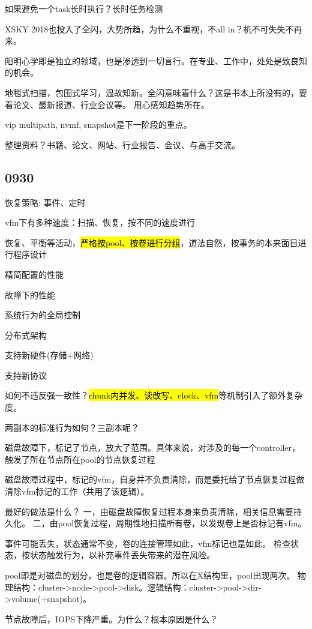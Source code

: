 如果避免一个task长时执行？长时任务检测

XSKY 2018也投入了全闪，大势所趋，为什么不重视，不all in？机不可失失不再来。

阳明心学即是独立的领域，也是渗透到一切言行。在专业、工作中，处处是致良知的机会。

地毯式扫描，包围式学习，温故知新。全闪意味着什么？这是书本上所没有的，要看论文、最新报道、行业会议等。
用心感知趋势所在。

vip multipath, nvmf, snapshot是下一阶段的重点。

整理资料？书籍、论文、网站、行业报告、会议、与高手交流。

\subsection{0930}

\begin{enumbox}
\item 恢复策略: 事件、定时
\item vfm下有多种速度：扫描、恢复，按不同的速度进行
\item 恢复、平衡等活动，\hl{严格按pool、按卷进行分组}，道法自然，按事务的本来面目进行程序设计
\item 精简配置的性能
\item 故障下的性能
\item 系统行为的全局控制
\item *
\item 分布式架构
\item 支持新硬件(存储+网络)
\item 支持新协议
\end{enumbox}

如何不违反强一致性？\hl{chunk内并发、读改写、clock、vfm}等机制引入了额外复杂度。

两副本的标准行为如何？三副本呢？

磁盘故障下，标记了节点，放大了范围。具体来说，对涉及的每一个controller，触发了所在节点所在pool的节点恢复过程

磁盘故障过程中，标记的vfm，自身并不负责清除，而是委托给了节点恢复过程做清除vfm标记的工作（共用了该逻辑）。

最好的做法是什么？
一，由磁盘故障恢复过程本身来负责清除，相关信息需要持久化。
二，由pool恢复过程，周期性地扫描所有卷，以发现卷上是否标记有vfm。

事件可能丢失，状态通常不变，卷的连接管理如此，vfm标记也是如此。
检查状态，按状态触发行为，以补充事件丢失带来的潜在风险。

pool即是对磁盘的划分，也是卷的逻辑容器。所以在X结构里，pool出现两次。
物理结构：cluster->node->pool->disk。逻辑结构：cluster->pool->dir->volume(+snapshot)。

节点故障后，IOPS下降严重。为什么？根本原因是什么？
